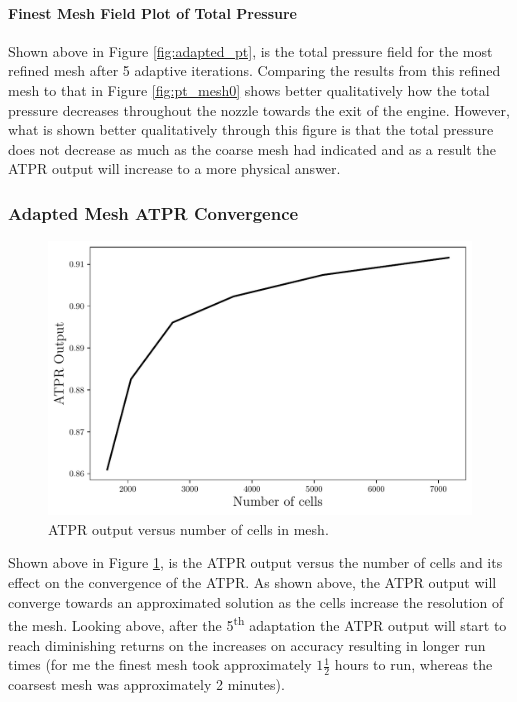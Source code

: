 \paragraph{Finest Mesh Field Plot of Total Pressure} Shown above in Figure \ref{fig:adapted_pt}, is the total pressure field for the most refined mesh after 5 adaptive iterations. Comparing the results from this refined mesh to that in Figure \ref{fig:pt_mesh0} shows better qualitatively how the total pressure decreases throughout the nozzle towards the exit of the engine. However, what is shown better qualitatively through this figure is that the total pressure does not decrease as much as the coarse mesh had indicated and as a result the ATPR output will increase to a more physical answer.

\pagebreak
\subsubsection{Adapted Mesh ATPR Convergence}
\begin{figure}[h]
    \centering
    \includegraphics[width = 0.9\linewidth]{rep/q4/ATPR.pdf}
    \caption[ATPR Convergence with Cell Number]{ATPR output versus number of cells in mesh.}
    \label{fig:adapted_ATPR}
\end{figure}

Shown above in Figure \ref{fig:adapted_ATPR}, is the ATPR output versus the number of cells and its effect on the convergence of the ATPR. As shown above, the ATPR output will converge towards an approximated solution as the cells increase the resolution of the mesh. Looking above, after the 5\textsuperscript{th} adaptation the ATPR output will start to reach diminishing returns on the increases on accuracy resulting in longer run times (for me the finest mesh took approximately $1\frac{1}{2}$ hours to run, whereas the coarsest mesh was approximately 2 minutes).

